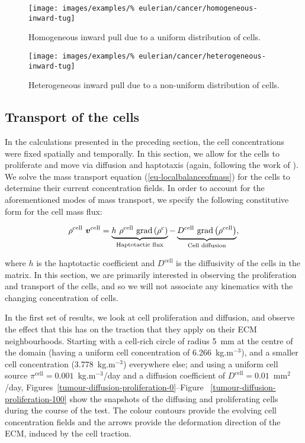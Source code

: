 \begin{figure}[!hptb]
\centering
\texttt{[image: images/examples/\%
eulerian/cancer/homogeneous-inward-tug]}
\caption{Homogeneous inward pull due to a uniform distribution of
  cells.}
\label{tumour-homogeneous-inward-tug}
\end{figure}

\begin{figure}[!hptb]
\centering
\texttt{[image: images/examples/\%
eulerian/cancer/heterogeneous-inward-tug]}
\caption{Heterogeneous inward pull due to a non-uniform distribution
  of cells.}
\label{tumour-heterogeneous-inward-tug}
\end{figure}

\clearpage

\subsection{Transport of the cells}
\label{cell-transport}

In the calculations presented in the preceding section, the cell
concentrations were fixed spatially and temporally. In this section,
we allow for the cells to proliferate and move via diffusion and
haptotaxis (again, following the work of \citet{namyetal:04}). We
solve the mass transport equation (\ref{eu-localbalanceofmass}) for
the cells to determine their current concentration
fields. In order to account for the aforementioned modes of mass
transport, we specify the following constitutive form for the cell
mass flux:

\begin{equation}
\rho^{\mathrm{cell}}\ \bv^{\mathrm{cell}} = \underbrace{h\ \rho^{\mathrm{cell}}\
\mathrm{grad}\left(\rho^{\mathrm{c}}\right)}_{\text{Haptotactic flux}}
-\underbrace{D^{\mathrm{cell}}\ \mathrm{grad}\left(\rho^{\mathrm{cell}}\right)
}_{\text{Cell diffusion}},
\end{equation}

\noindent where $h$ is the haptotactic coefficient and
$D^{\mathrm{cell}}$ is the diffusivity of the cells in the matrix. In
this section, we are primarily interested in observing the
proliferation and transport of the cells, and so we will not associate
any kinematics with the changing concentration of cells.

In the first set of results, we look at cell proliferation and
diffusion, and observe the effect that this has on the traction that
they apply on their ECM neighbourhoods. Starting with a cell-rich
circle of radius 5~mm at the centre of the domain (having a uniform cell
concentration of 6.266~kg.m$^{-3}$), and a smaller cell concentration
(3.778~kg.m$^{-3}$) everywhere else; and using a uniform cell source
$\pi^{\mathrm{cell}}=0.001$~kg.m$^{-3}$/day and a diffusion
coefficient of $D^{\mathrm{cell}}=0.01$~mm$^2$/day,
Figures~\ref{tumour-diffusion-proliferation-0}--Figure~%
\ref{tumour-diffusion-proliferation-100} show the snapshots of the
diffusing and proliferating cells during the course of the test. The colour
contours provide the evolving cell concentration fields and the arrows
provide the deformation direction of the ECM, induced by the cell
traction.

